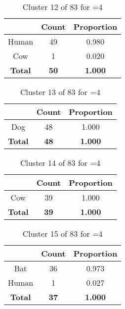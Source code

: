 \begin{table}[ht!]
\centering
\begin{tabular}{|c|c|c|}
\hline
\bf \Spec{} &\bf Count &\bf Proportion\\ \hline \hline
Human & 49 & 0.980\\ \hline
Cow & 1 & 0.020\\ \hline
\hline
\bf Total & \bf 50 & \bf 1.000\\ \hline
\end{tabular}
\label{tab:cluster:12:4}
\caption{Cluster 12 of 83 for \minneigh{}=4}
\end{table}

\begin{table}[ht!]
\centering
\begin{tabular}{|c|c|c|}
\hline
\bf \Spec{} &\bf Count &\bf Proportion\\ \hline \hline
Dog & 48 & 1.000\\ \hline
\hline
\bf Total & \bf 48 & \bf 1.000\\ \hline
\end{tabular}
\label{tab:cluster:13:4}
\caption{Cluster 13 of 83 for \minneigh{}=4}
\end{table}

\begin{table}[ht!]
\centering
\begin{tabular}{|c|c|c|}
\hline
\bf \Spec{} &\bf Count &\bf Proportion\\ \hline \hline
Cow & 39 & 1.000\\ \hline
\hline
\bf Total & \bf 39 & \bf 1.000\\ \hline
\end{tabular}
\label{tab:cluster:14:4}
\caption{Cluster 14 of 83 for \minneigh{}=4}
\end{table}

\begin{table}[ht!]
\centering
\begin{tabular}{|c|c|c|}
\hline
\bf \Spec{} &\bf Count &\bf Proportion\\ \hline \hline
Bat & 36 & 0.973\\ \hline
Human & 1 & 0.027\\ \hline
\hline
\bf Total & \bf 37 & \bf 1.000\\ \hline
\end{tabular}
\label{tab:cluster:15:4}
\caption{Cluster 15 of 83 for \minneigh{}=4}
\end{table}

